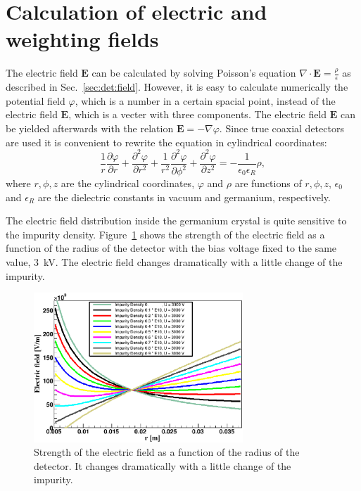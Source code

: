 \section{Calculation of electric and weighting fields}
\label{sec:pss:field}
The electric field $\mathbf{E}$ can be calculated by solving Poisson's equation $\nabla \cdot \mathbf{E} = \frac{\rho}{\epsilon}$ as described in Sec.~\ref{sec:det:field}. However, it is easy to calculate numerically the potential field $\varphi$, which is a number in a certain spacial point, instead of the electric field $\mathbf{E}$, which is a vecter with three components. The electric field $\mathbf{E}$ can be yielded afterwards with the relation $\mathbf{E} = - \nabla\varphi$. Since true coaxial detectors are used it is convenient to rewrite the equation in cylindrical coordinates:
\begin{equation}
\frac{1}{r} \frac{\partial \varphi}{\partial r} + \frac{\partial^{2} \varphi}{\partial r^{2}} + \frac{1}{r^{2}} \frac{\partial^{2} \varphi}{\partial \phi^{2}} +
\frac{\partial^{2} \varphi}{\partial z^{2}} = - \frac{1}{\epsilon_{0}
\epsilon_{R}} \rho,
\label{eq:pss:pocyl}
\end{equation}
where $r, \phi, z$ are the cylindrical coordinates, $\varphi$ and $\rho$ are functions of $r, \phi, z$, $\epsilon_{0}$ and $\epsilon_{R}$ are the dielectric constants in vacuum and germanium, respectively.

The electric field distribution inside the germanium crystal is quite sensitive to the impurity density. Figure~\ref{fig:pss:rho} shows the strength of the electric field as a function of the radius of the detector with the bias voltage fixed to the same value, 3~kV. The electric field changes dramatically with a little change of the impurity.

\begin{figure}[htbp]
\centering
\includegraphics[width=0.7\textwidth]{rho}
\caption{Strength of the electric field as a function of the radius of the detector. It changes dramatically with a little change of the impurity.}
\label{fig:pss:rho}
\end{figure}

